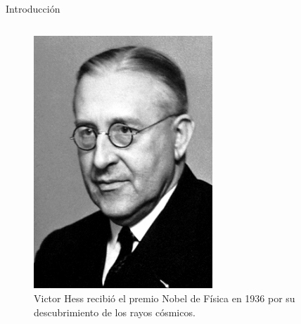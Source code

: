 \begin{frame}{Introducción}
\begin{columns}
            \begin{column}{0.3\textwidth} %
                \begin{figure}
                    \centering
                    \includegraphics[width=0.6\textwidth]{Figures/vhess.jpg}
                    \caption{\tiny Victor Hess recibió el premio Nobel de Física en 1936 por su descubrimiento de los rayos cósmicos.}
                \end{figure}
            \end{column}            
        \end{columns} 
    \end{frame}

